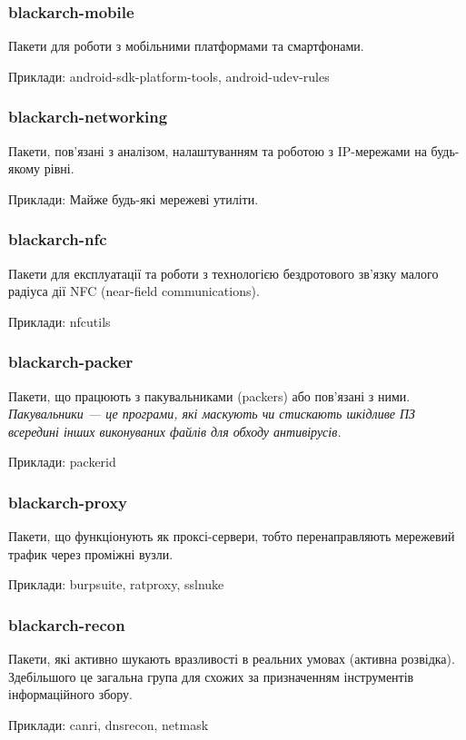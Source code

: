 \documentclass[a4paper, oneside, 11pt]{book}
\begin{document}
\subsubsection{blackarch-mobile}
Пакети для роботи з мобільними платформами та смартфонами.

Приклади: android-sdk-platform-tools, android-udev-rules

\subsubsection{blackarch-networking}
Пакети, пов'язані з аналізом, налаштуванням та роботою з IP-мережами на будь-якому рівні.

Приклади: Майже будь-які мережеві утиліти.

\subsubsection{blackarch-nfc}
Пакети для експлуатації та роботи з технологією бездротового зв'язку малого радіуса дії NFC (near-field communications).

Приклади: nfcutils

\subsubsection{blackarch-packer}
Пакети, що працюють з пакувальниками (packers) або пов'язані з ними.
\textit{Пакувальники --- це програми, які маскують чи стискають шкідливе ПЗ всередині інших виконуваних файлів для обходу антивірусів.}

Приклади: packerid

\subsubsection{blackarch-proxy}
Пакети, що функціонують як проксі-сервери, тобто перенаправляють мережевий трафик через проміжні вузли.

Приклади: burpsuite, ratproxy, sslnuke

\subsubsection{blackarch-recon}
Пакети, які активно шукають вразливості в реальних умовах (активна розвідка). Здебільшого це загальна група для схожих за призначенням інструментів інформаційного збору.

Приклади: canri, dnsrecon, netmask
\end{document}
